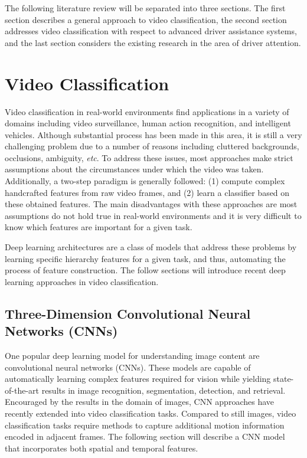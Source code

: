 The following literature review will be separated into three sections. The first section describes a general approach to video classification, the second section addresses video classification with respect to advanced driver assistance systems, and the last section considers the existing research in the area of driver attention.

\section{Video Classification}
Video classification in real-world environments find applications in a variety of domains including video surveillance, human action recognition, and intelligent vehicles. Although substantial process has been made in this area, it is still a very challenging problem due to a number of reasons including cluttered backgrounds, occlusions, ambiguity, \emph{etc}. To address these issues, most approaches make strict assumptions about the circumstances under which the video was taken. Additionally, a two-step paradigm is generally followed: (1) compute complex handcrafted features from raw video frames, and (2) learn a classifier based on these obtained features. The main disadvantages with these approaches are most assumptions do not hold true in real-world environments and it is very difficult to know which features are important for a given task.

Deep learning architectures are a class of models that address these problems by learning specific hierarchy features for a given task, and thus, automating the process of feature construction. The follow sections will introduce recent deep learning approaches in video classification.

\subsection{Three-Dimension Convolutional Neural Networks (CNNs)}
One popular deep learning model for understanding image content are convolutional neural networks (CNNs). These models are capable of automatically learning complex features required for vision while yielding state-of-the-art results in image recognition, segmentation, detection, and retrieval. Encouraged by the results in the domain of images, CNN approaches have recently extended into video classification tasks. Compared to still images, video classification tasks require methods to capture additional motion information encoded in adjacent frames. The following section will describe a CNN model that incorporates both spatial and temporal features.

